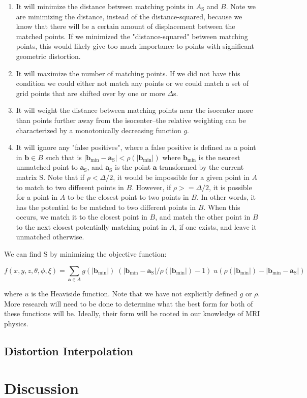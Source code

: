 \documentclass[12pt]{article}
\begin{document}
\begin{enumerate}
\item It will minimize the distance between matching points in $A_\mathrm{S}$ and $B$.  Note we are minimizing the distance, instead of the distance-squared, because we know that there will be a certain amount of displacement between the matched points.  If we minimized the "distance-squared" between matching points, this would likely give too much importance to points with significant geometric distortion.
\item It will maximize the number of matching points.  If we did not have this condition we could either not match any points or we could match a set of grid points that are shifted over by one or more $\Delta$s.
\item It will weight the distance between matching points near the isocenter more than points further away from the isocenter--the relative weighting can be characterized by a monotonically decreasing function $g$.
\item It will ignore any "false positives", where a false positive is defined as a point in $\mathbf{b} \in B$ such that is $|\mathbf{b}_\textrm{min} − \mathbf{a}_\textrm{S}| < \rho(|\mathbf{b}_\textrm{min}|)$ where $\mathbf{b}_\textrm{min}$ is the nearest unmatched point to $\mathbf{a}_\textrm{S}$, and $\mathbf{a}_\textrm{S}$ is the point $\mathbf{a}$ transformed by the current matrix $\textrm{S}$.  Note that if $\rho < \Delta/2$, it would be impossible for a given point in $A$ to match to two different points in $B$.  However, if $\rho >= \Delta/2$, it is possible for a point in $A$ to be the closest point to two points in $B$.  In other words, it has the potential to be matched to two different points in $B$.  When this occurs, we match it to the closest point in $B$, and match the other point in $B$ to the next closest potentially matching point in $A$, if one exists, and leave it unmatched otherwise.
\end{enumerate}

We can find $\mathrm{S}$ by minimizing the objective function:

$$
f(x, y, z, \theta, \phi, \xi) =
\sum_{\mathbf{a} \in A} g(\left|\mathbf{b}_\textrm{min}\right|)
\;
(\left|\mathbf{b}_\textrm{min} - \mathbf{a}_\textrm{S}\right|/\rho(|\mathbf{b}_\textrm{min}|) - 1)
\;
u(\rho(|\mathbf{b}_\textrm{min}|) - \left|\mathbf{b}_\textrm{min} - \mathbf{a}_\textrm{S}\right|)
$$

where $u$ is the Heaviside function.  Note that we have not explicitly defined $g$ or $\rho$.  More research will need to be done to determine what the best form for both of these functions will be.  Ideally, their form will be rooted in our knowledge of MRI physics.

\subsection{Distortion Interpolation}


\section{Discussion}



\end{document}
